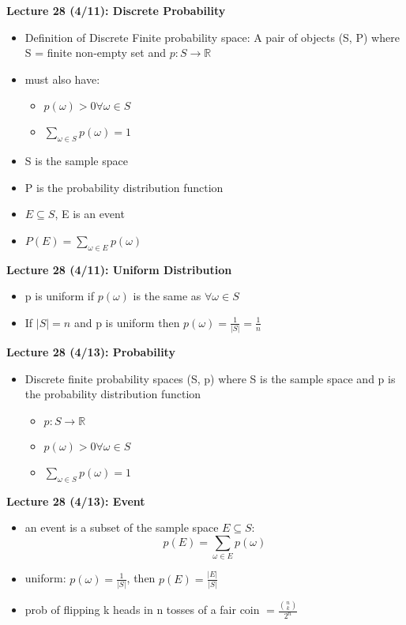 \documentclass[twocolumn]{article}
\begin{document}
\textbf{Lecture 28 (4/11): Discrete Probability}
\begin{itemize}
    \item Definition of Discrete Finite probability space: A pair of objects (S, P) where S = finite non-empty set and $p: S \rightarrow \mathbb{R}$
    \item must also have:
    \begin{itemize}
        \item $p(\omega) > 0 \forall \omega \in S$
        \item $\sum_{\omega \in S} p(\omega) = 1$
    \end{itemize}
    \item S is the sample space
    \item P is the probability distribution function
    \item $E \subseteq S$, E is an event
    \item $P(E) = \sum_{\omega \in E} p(\omega)$
\end{itemize}

\textbf{Lecture 28 (4/11): Uniform Distribution}
\begin{itemize}
    \item p is uniform if $p(\omega)$ is the same as $\forall \omega \in S$
    \item If $|S|=n$ and p is uniform then $p(\omega) = \frac{1}{|S|} = \frac{1}{n}$
\end{itemize}

\textbf{Lecture 28 (4/13): Probability}
\begin{itemize}
    \item Discrete finite probability spaces (S, p) where S is the sample space and p is the probability distribution function
    \begin{itemize}
        \item $p: S \rightarrow \mathbb{R}$
        \item $p(\omega) > 0 \forall \omega \in S$
        \item $\sum_{\omega \in S}p(\omega) = 1$
    \end{itemize}
\end{itemize}

\textbf{Lecture 28 (4/13): Event}
\begin{itemize}
    \item an event is a subset of the sample space $E \subseteq S$: 
    $$p(E) = \sum_{\omega \in E} p(\omega)$$
    \item uniform: $p(\omega) = \frac{1}{|S|}$, then $p(E) = \frac{|E|}{|S|}$
    \item prob of flipping k heads in n tosses of a fair coin $=\frac{{n \choose k}}{2^n}$
\end{itemize}
\end{document}
